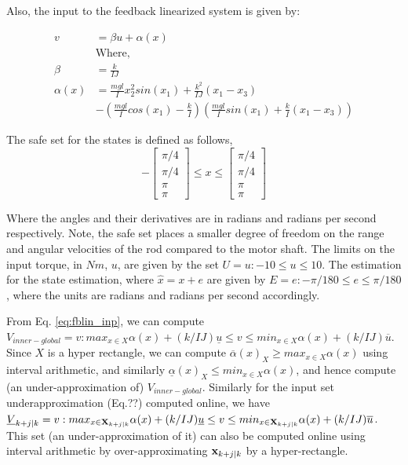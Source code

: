 Also, the input to the feedback linearized system is given by:

\begin{subequations}
\label{eq:fblin_inp}
\begin{align}
v&=\beta u+ \alpha(x) \\
&\text{Where,} \nonumber \\
\beta&=\frac{k}{IJ} \\
\alpha(x)&=\frac{mgl}{I}x_2^2sin(x_1) + \frac{k^2}{IJ}(x_1-x_3) \nonumber \\
&- (\frac{mgl}{I}cos(x_1)-\frac{k}{I})(\frac{mgl}{I}sin(x_1)+\frac{k}{I}(x_1-x_3))
\end{align}
\end{subequations}

The safe set for the states is defined as follows, 
\begin{equation}
 -\begin{bmatrix} \pi/4  \\ \pi/4  \\ \pi \\ \pi \end{bmatrix} \leq x \leq \begin{bmatrix} \pi/4  \\ \pi/4  \\ \pi \\ \pi \end{bmatrix}
\end{equation}

Where the angles and their derivatives are in radians and radians per second respectively. Note, the safe set places a smaller degree of freedom on the range and angular velocities of the rod compared to the motor shaft.
The limits on the input torque, in $Nm$, $u$, are given by the set $U = u :-10 \leq u \leq 10$. The estimation for the state estimation, where $\hat{x} = x + e$ are given by $E = e:-\pi /180 \leq e \leq \pi /180 $, where the units are radians and radians per second accordingly. 

From Eq. \ref{eq:fblin_inp}, we can compute $V_{inner-global} =v: max_{x\in X}\alpha(x) + (k/IJ)\underline{u} \leq v \leq min_{x\in X}\alpha(x) + (k/IJ)\overline{u}$. Since $X$ is a hyper rectangle, we can compute $\overline{\alpha}(x)_{X} \geq  max_{x\in X}\alpha(x)$ using interval arithmetic, and similarly $\underline{\alpha}(x)_{X} \leq  min_{x\in X}\alpha(x)$, and hence compute (an under-approximation of) $V_{inner-global}$.
Similarly for the input set underapproximation (Eq.??) computed online, we have $\underline{V}_{k+j|k} = v:   max_{x\in \mathbf{X}_{k+j|k}} \alpha(x) + (k/IJ)\underline{u} \leq v \leq  min_{x\in \mathbf{X}_{k+j|k}}\alpha(x) + (k/IJ)\overline{u}$. This set (an under-approximation of it) can also be computed online using interval arithmetic by over-approximating $\mathbf{x}_{k+j|k}$ by a hyper-rectangle. 

